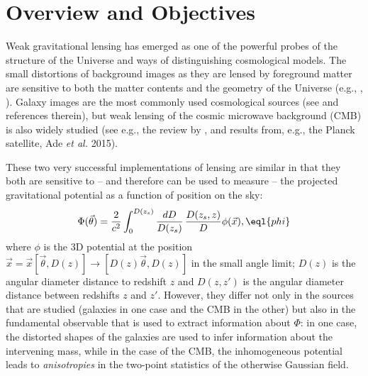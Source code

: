 \section{Overview and Objectives}
Weak gravitational lensing has emerged as one of the powerful probes
of the structure of the Universe and ways of distinguishing
cosmological models. The small distortions of background images as
they are lensed by foreground matter are sensitive to both the matter
contents and the geometry of the Universe (e.g., \cite{blandford92},
\cite{hoekstra2008}).  Galaxy images are the most commonly used
cosmological sources (see \cite{Kilbinger2015} and references
therein), but weak lensing of the cosmic microwave background (CMB) is
also widely studied (see e.g., the review by \cite{lewis2006}, and
results from, e.g., the Planck satellite, Ade {\it et al.} 2015).
 
These two very successful implementations of lensing are similar in that they both are sensitive to -- and therefore can be used to measure -- the projected gravitational potential as a function of position on the sky:%
\begin{equation}
\Phi(\vec\theta)=\frac{2}{c^2}\int^{D(z_{s})}_{0}\frac{dD}{D(z_s)}\,\frac{D(z_{s},z)}{D}\phi(\vec
x),\eql{phi}
\end{equation}
where $\phi$ is the 3D potential at the position $\vec x=\vec
x[\vec\theta,D(z)]\rightarrow [D(z)\vec\theta,D(z)]$ in the small
angle limit; $D(z)$ is the angular diameter distance to redshift $z$
and $D(z,z')$ is the angular diameter distance between redshifts $z$
and $z'$. However, they differ not only in the sources that are
studied (galaxies in one case and the CMB in the other) but also in
the fundamental observable that is used to extract information about
$\Phi$: in one case, the distorted shapes of the galaxies are used to
infer information about the intervening mass, while in the case of the
CMB, the inhomogeneous potential leads to {\it anisotropies} in the
two-point statistics of the otherwise Gaussian field.



